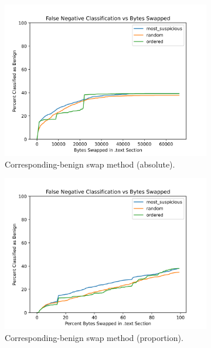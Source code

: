 \documentclass{article}
\begin{document}
\pagebreak

\begin{figure}[ht]
	\centering
	\begin{subfigure}{.5\textwidth}
		\centering
		\includegraphics[scale=.5]{./figures/plan/2/corresponding-absolute.png}
		\caption{Corresponding-benign swap method (absolute).}
	\end{subfigure}%
	\begin{subfigure}{.5\textwidth}
		\centering
		\includegraphics[scale=.5]{./figures/plan/2/corresponding-proportion.png}
		\caption{Corresponding-benign swap method (proportion).}
	\end{subfigure}\\
	\begin{subfigure}{.5\textwidth}

\end{subfigure}
\end{figure}
\end{document}
